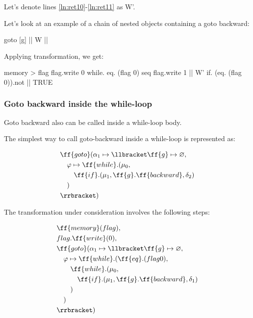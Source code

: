 \documentclass[sigplan,review,11pt,nonacm,natbib=false]{acmart}
\begin{document}
Let's denote lines \ref{ln:ret10}-\ref{ln:ret11} as W'.

Let's look at an example of a chain of nested objects containing a goto backward:

\begin{ffcode}

goto
  [g]
    ||
      W
      ||

\end{ffcode}

Applying transformation, we get:
\begin{ffcode}

memory > flag
flag.write 0
while.
  eq. (flag 0)
  seq
    flag.write 1
    ||
      W'
      if.
        (eq. (flag 0)).not
        ||
        TRUE

\end{ffcode}


\subsubsection{Goto backward inside the while-loop}
Goto backward also can be called inside a while-loop body.

The simplest way to call goto-backward inside a while-loop is represented as:

\begin{equation}
\begin{split}
& \ff{goto}(\alpha_1 \mapsto \llbracket \ff{g} \mapsto \varnothing, \\
& \quad \varphi \mapsto \ff{while}.(\mu_0, \\
& \quad \quad \ff{if}.(\mu_1, \ff{g}.\ff{backward}, \delta_2) \\
& \quad ) \\
& \rrbracket) \\
\end{split}
\end{equation}

The transformation under consideration involves the following steps:

\begin{equation}
\begin{split}
& \ff{memory}(flag), \\
& flag.\ff{write}(0), \\
& \ff{goto}(\alpha_1 \mapsto \llbracket \ff{g} \mapsto \varnothing, \\
& \quad \varphi \mapsto \ff{while}.(\ff{eq}.(flag 0), \\
& \quad \quad \ff{while}.(\mu_0, \\
& \quad \quad \quad \ff{if}.( \mu_1, \ff{g}.\ff{backward}, \delta_1 ) \\
& \quad \quad ) \\
& \quad ) \\
& \rrbracket) \\
\end{split}
\end{equation}
\end{document}
